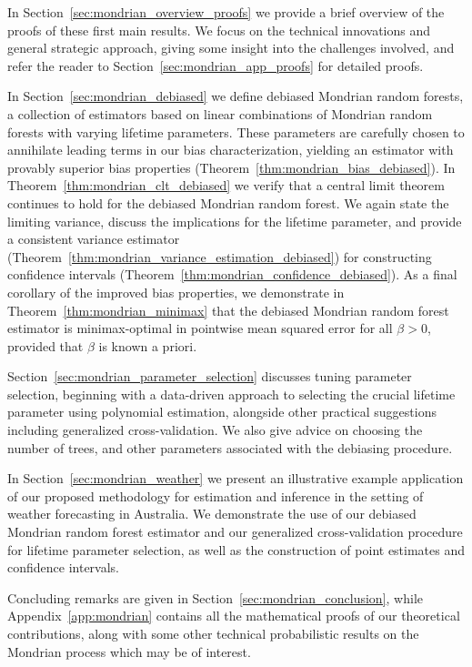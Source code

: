 \documentclass[11pt,lof]{puthesis}
\theoremstyle{break}
\theoremstyle{proof}
\begin{document}
In Section~\ref{sec:mondrian_overview_proofs} we provide a brief overview of
the proofs
of these first main results. We focus on the technical innovations and general
strategic approach, giving some insight into the challenges involved, and refer
the reader to Section~\ref{sec:mondrian_app_proofs} for detailed proofs.

In Section~\ref{sec:mondrian_debiased} we define debiased Mondrian random
forests, a
collection of estimators based on linear combinations of Mondrian random
forests with varying lifetime parameters. These parameters are carefully chosen
to annihilate leading terms in our bias characterization, yielding an estimator
with provably superior bias properties
(Theorem~\ref{thm:mondrian_bias_debiased}). In
Theorem~\ref{thm:mondrian_clt_debiased}
we verify that a central limit theorem continues to hold for the debiased
Mondrian random forest. We again state the limiting variance, discuss the
implications for the lifetime parameter, and provide a consistent variance
estimator (Theorem~\ref{thm:mondrian_variance_estimation_debiased}) for
constructing
confidence intervals (Theorem~\ref{thm:mondrian_confidence_debiased}). As a
final
corollary of the improved bias properties, we demonstrate in
Theorem~\ref{thm:mondrian_minimax} that the debiased Mondrian random forest
estimator is minimax-optimal in pointwise mean squared error for all
$\beta > 0$, provided that $\beta$ is known a priori.

Section~\ref{sec:mondrian_parameter_selection} discusses tuning parameter
selection,
beginning with a data-driven approach to selecting the crucial lifetime
parameter using polynomial estimation, alongside other practical suggestions
including generalized cross-validation.
We also give advice on choosing the number of trees, and other parameters
associated with the debiasing procedure.

In Section~\ref{sec:mondrian_weather} we present an illustrative example
application of our proposed methodology for estimation and inference in the
setting of weather forecasting in Australia. We demonstrate the use of
our debiased Mondrian random forest estimator and our
generalized cross-validation procedure for lifetime parameter selection,
as well as the construction of point estimates and confidence intervals.

Concluding remarks are given in Section~\ref{sec:mondrian_conclusion}, while
Appendix~\ref{app:mondrian} contains all the mathematical proofs of our
theoretical contributions, along with some other technical
probabilistic results on the Mondrian process which may be of interest.
\end{document}
